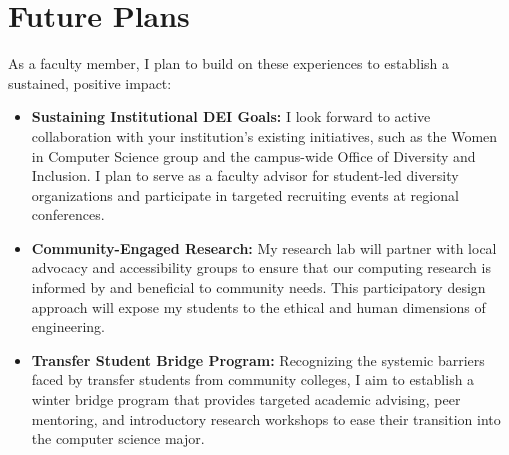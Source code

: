 \section{Future Plans}

As a faculty member, I plan to build on these experiences to establish a sustained, positive impact:

\begin{itemize}
    \item \textbf{Sustaining Institutional DEI Goals:} I look forward to active collaboration with your institution's existing initiatives, such as the Women in Computer Science group and the campus-wide Office of Diversity and Inclusion. I plan to serve as a faculty advisor for student-led diversity organizations and participate in targeted recruiting events at regional conferences.
    \item \textbf{Community-Engaged Research:} My research lab will partner with local advocacy and accessibility groups to ensure that our computing research is informed by and beneficial to community needs. This participatory design approach will expose my students to the ethical and human dimensions of engineering.
    \item \textbf{Transfer Student Bridge Program:} Recognizing the systemic barriers faced by transfer students from community colleges, I aim to establish a winter bridge program that provides targeted academic advising, peer mentoring, and introductory research workshops to ease their transition into the computer science major.
\end{itemize}
